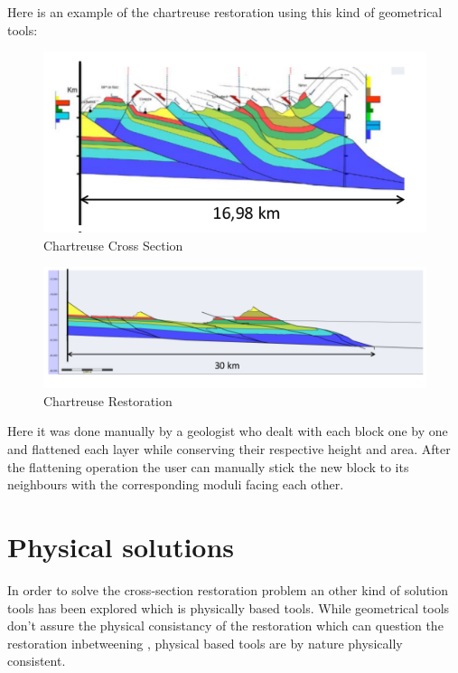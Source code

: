 \documentclass[12pt, a4paper]{memoir} %
\begin{document}
Here is an example of the chartreuse restoration using this kind of geometrical tools:

\begin{figure}[H]
	\centering
	\includegraphics[scale=0.8]{Wraped_Section.png}
	\caption{Chartreuse Cross Section}
\end{figure}

\begin{figure}[H]
	\centering
	\includegraphics[scale=0.6]{UnWraped_Section.png}
	\caption{Chartreuse Restoration}
\end{figure}

 Here it was done manually by a geologist who  dealt with each block one by one and flattened each layer while conserving their respective height and area. After the flattening operation the user can manually stick the new block to its neighbours with the corresponding moduli facing each other.

\section{Physical solutions}

In order to solve the cross-section restoration problem an other kind of solution tools has been explored which is physically based tools. While geometrical tools don't assure the physical consistancy of the restoration which can question the restoration inbetweening , physical based tools are by nature physically consistent.\\\\
\end{document}
